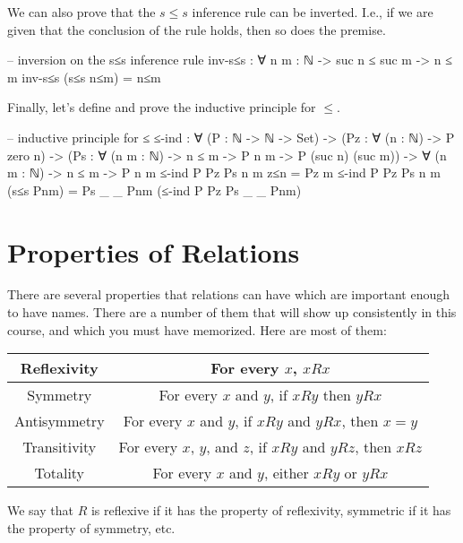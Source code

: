 \documentclass{lecturenotes}
\begin{document}
We can also prove that the $s\le s$ inference rule can be inverted.
I.e., if we are given that the conclusion of the rule holds, then so does the premise.

\begin{center}
\begin{code}
-- inversion on the s≤s inference rule
inv-s≤s : ∀ {n m : ℕ} -> suc n ≤ suc m -> n ≤ m
inv-s≤s (s≤s n≤m) = n≤m
\end{code}
\end{center}

Finally, let's define and prove the inductive principle for $\le$.

\begin{center}
\begin{code}
-- inductive principle for ≤
≤-ind : ∀ (P : ℕ -> ℕ -> Set) ->
  (Pz : ∀ (n : ℕ) -> P zero n) ->
  (Ps : ∀ (n m : ℕ) -> n ≤ m -> P n m -> P (suc n) (suc m)) ->
  ∀ (n m : ℕ) -> n ≤ m -> P n m
≤-ind P Pz Ps n m z≤n = Pz m
≤-ind P Pz Ps n m (s≤s Pnm) = Ps _ _ Pnm (≤-ind P Pz Ps _ _ Pnm)
\end{code}
\end{center}

\section{Properties of Relations}

There are several properties that relations can have which are important enough to have names.
There are a number of them that will show up consistently in this course, and which you must have memorized.
Here are most of them:

\begin{center}
\begin{tabular}{|c | c|}
  \hline
  Reflexivity & For every $x$, $x R x$ \\
  \hline
  Symmetry & For every $x$ and $y$, if $x R y$ then $y R x$ \\
  \hline
  Antisymmetry & For every $x$ and $y$, if $x R y$ and $y R x$, then $x = y$ \\
  \hline
  Transitivity & For every $x$, $y$, and $z$, if $x R y$ and $y R z$, then $x R z$ \\
  \hline
  Totality & For every $x$ and $y$, either $x R y$ or $y R x$ \\
  \hline
\end{tabular}
\end{center}

We say that $R$ is reflexive if it has the property of reflexivity, symmetric if it has the property of symmetry, etc.
\end{document}
